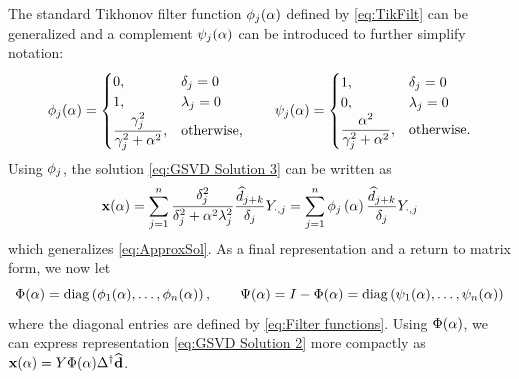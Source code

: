 \documentclass[12pt]{article}
\begin{document}
The standard Tikhonov filter function $\phi_j(\alpha)$ defined by \eqref{eq:TikFilt} can be generalized and a complement $\psi_j(\alpha)$ can be introduced to further simplify notation:
\begin{equation}
\label{eq:Filter functions}
\phi_j(\alpha) = \begin{cases}
0, & \delta_j = 0 \\
1, & \lambda_j = 0 \\
\dfrac{\gamma^2_j}{\gamma^2_j + \alpha^2}, & \text{otherwise,}
\end{cases} \qquad
\psi_j(\alpha) = \begin{cases}
1, & \delta_j = 0 \\
0, & \lambda_j = 0 \\
\dfrac{\alpha^2}{\gamma^2_j + \alpha^2}, & \text{otherwise.}
\end{cases}
\end{equation}
Using $\phi_j$, the solution \eqref{eq:GSVD Solution 3} can be written as
\begin{equation}
\label{eq:GSVD Solution 2}
\mathbf{x}(\alpha) = \sum_{j = 1}^{n} \frac{\delta^2_j}{\delta^2_j + \alpha^2 \lambda^2_j} \frac{\widehat{d}_{j+k}}{\delta_j} Y_{\cdot,j} = \sum_{j = 1}^{n} \phi_j\left(\alpha\right) \frac{\widehat{d}_{j+k}}{\delta_j} Y_{\cdot,j}
\end{equation} 
which generalizes \eqref{eq:ApproxSol}. As a final representation and a return to matrix form, we now let
\[\Phi(\alpha) = \operatorname{diag}\left(\phi_1(\alpha),\ldots,\phi_n(\alpha)\right), \qquad \Psi(\alpha) = I - \Phi(\alpha) = \operatorname{diag}\left(\psi_1(\alpha),\ldots,\psi_n(\alpha)\right)\]
where the diagonal entries are defined by \eqref{eq:Filter functions}. Using $\Phi(\alpha)$, we can express representation \eqref{eq:GSVD Solution 2} more compactly as $\mathbf{x}(\alpha) = Y\Phi(\alpha){\Delta}^\dagger\widehat{\mathbf{d}}$.
\end{document}
